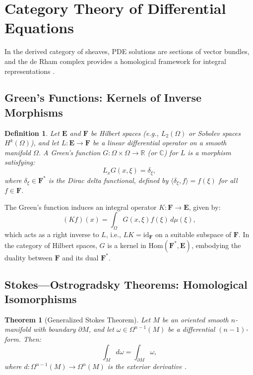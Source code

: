 \documentclass{article}
\theoremstyle{plain}
\newtheorem{theorem}{Theorem}[section]
\newtheorem{definition}{Definition}[section]
\newcommand{\cat}[1]{\mathbf{#1}}
\newcommand{\Hom}{\mathrm{Hom}}
\newcommand{\id}{\mathrm{id}}
\begin{document}
\section{Category Theory of Differential Equations}
In the derived category of sheaves, PDE solutions are sections of vector bundles,
and the de Rham complex provides a homological framework for integral representations \cite{nLab_de_Rham_theorem}.

\subsection{Green's Functions: Kernels of Inverse Morphisms}

\begin{definition}
Let \(\cat{E}\) and \(\cat{F}\) be Hilbert spaces (e.g., \(L_2(\Omega)\)
or Sobolev spaces \(H^k(\Omega)\)), and let \(L: \cat{E} \to \cat{F}\)
be a linear differential operator on a smooth manifold \(\Omega\).
A \emph{Green's function} \(G: \Omega \times \Omega \to \mathbb{R}\)
(or \(\mathbb{C}\)) for \(L\) is a morphism satisfying:
\[
L_x G(x, \xi) = \delta_\xi,
\]
where \(\delta_\xi \in \cat{F}^*\) is the Dirac delta functional,
defined by \(\langle \delta_\xi, f \rangle = f(\xi)\) for all \(f \in \cat{F}\).
\end{definition}

The Green's function induces an integral operator \(K: \cat{F} \to \cat{E}\), given by:
\[
(K f)(x) = \int_\Omega G(x, \xi) f(\xi) \, d\mu(\xi),
\]
which acts as a right inverse to \(L\), i.e., \(L K = \id_{\cat{F}}\)
on a suitable subspace of \(\cat{F}\). In the category of Hilbert spaces,
\(G\) is a kernel in \(\Hom(\cat{F}^*, \cat{E})\), embodying the duality
between \(\cat{F}\) and its dual \(\cat{F}^*\).

\subsection{Stokes---Ostrogradsky Theorems: Homological Isomorphisms}

\begin{theorem}[Generalized Stokes Theorem]
Let \(M\) be an oriented smooth \(n\)-manifold with boundary \(\partial M\), and let \(\omega \in \Omega^{n-1}(M)\) be a differential \((n-1)\)-form. Then:
\[
\int_M d\omega = \int_{\partial M} \omega,
\]
where \(d: \Omega^{n-1}(M) \to \Omega^n(M)\) is the exterior derivative \cite{nLab_stokes_theorem}.
\end{theorem}
\end{document}
